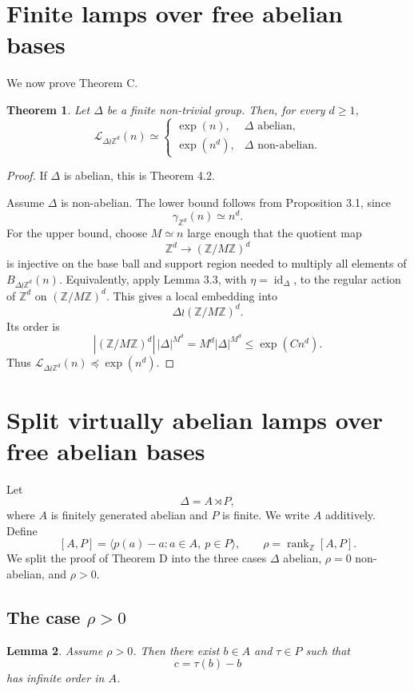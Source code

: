 \documentclass[11pt]{article}
\newcommand{\LEF}{\mathcal L}
\newcommand{\Z}{\mathbb Z}
\newcommand{\rank}{\operatorname{rank}}
\newtheorem{theorem}{Theorem}[section]
\newtheorem{lemma}[theorem]{Lemma}
\begin{document}
\section{Finite lamps over free abelian bases}

We now prove Theorem C.

\begin{theorem}
Let \(\Delta\) be a finite non-trivial group. Then, for every \(d\ge 1\),
\[
\LEF_{\Delta\wr\Z^d}(n)\simeq
\begin{cases}
\exp(n), & \Delta\text{ abelian},\\
\exp(n^d), & \Delta\text{ non-abelian}.
\end{cases}
\]
\end{theorem}

\begin{proof}
If \(\Delta\) is abelian, this is Theorem 4.2.

Assume \(\Delta\) is non-abelian. The lower bound follows from Proposition 3.1, since
\[
\gamma_{\Z^d}(n)\simeq n^d.
\]
For the upper bound, choose \(M\simeq n\) large enough that the quotient map
\[
\Z^d\to(\Z/M\Z)^d
\]
is injective on the base ball and support region needed to multiply all elements of \(B_{\Delta\wr\Z^d}(n)\). Equivalently, apply Lemma 3.3, with \(\eta=\operatorname{id}_\Delta\), to the regular action of \(\Z^d\) on \((\Z/M\Z)^d\). This gives a local embedding into
\[
\Delta\wr(\Z/M\Z)^d.
\]
Its order is
\[
|(\Z/M\Z)^d|\,|\Delta|^{M^d}=M^d|\Delta|^{M^d}\le \exp(Cn^d).
\]
Thus \(\LEF_{\Delta\wr\Z^d}(n)\preceq\exp(n^d)\).
\end{proof}

\section{Split virtually abelian lamps over free abelian bases}

Let
\[
\Delta=A\rtimes P,
\]
where \(A\) is finitely generated abelian and \(P\) is finite. We write \(A\) additively. Define
\[
[A,P]=\langle p(a)-a:a\in A,\ p\in P\rangle,\qquad \rho=\rank_\Z[A,P].
\]
We split the proof of Theorem D into the three cases \(\Delta\) abelian, \(\rho=0\) non-abelian, and \(\rho>0\).

\subsection{The case \(\rho>0\)}

\begin{lemma}
Assume \(\rho>0\). Then there exist \(b\in A\) and \(\tau\in P\) such that
\[
c=\tau(b)-b
\]
has infinite order in \(A\).
\end{lemma}
\end{document}

